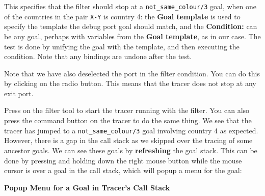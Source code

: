 This specifies that the filter should stop at a \verb'not_same_colour/3'
goal, when one of the countries in the pair \verb'X-Y' is country 4: the {\bf
Goal template} is used to specify the template the debug port goal should
match, and the {\bf Condition:} can be any {\eclipse} goal, perhaps with variables
from the {\bf Goal template}, as in our case. The test is done by unifying
the goal with the template, and then executing the condition. Note that any
bindings are undone after the test. 

Note that we have also deselected the  port in the filter
condition. You can do this by clicking on the  radio
button. This means that the tracer does not stop at any exit port.

Press  on the filter tool to start the tracer running with the
filter. You can also press the  command button on the tracer
to do the same thing.
We see that the tracer has jumped to a \verb'not_same_colour/3' goal
involving country 4 as expected. However, there is a gap in the call stack
as we skipped over the tracing of some ancestor goals. We can see these
goals by {\bf refreshing} the goal stack. This can be done by pressing and
holding down the right mouse button while the mouse cursor is over a goal
in the call stack, which will popup a menu for the goal:

\begin{center}

\vspace{3mm}
{\bf Popup Menu for a Goal in Tracer's Call Stack}
\end{center}

